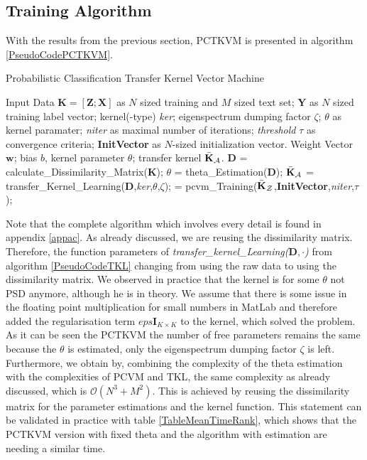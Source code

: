 \subsection{Training Algorithm}\label{InSubSecTraining}
With the results from the previous section, \acs{PCTKVM} is presented in algorithm \ref{PseudoCodePCTKVM}.
\begin{algorithm}
	\caption{Probabilistic Classification Transfer Kernel Vector Machine }\label{PseudoCodePCTKVM}	
	\begin{algorithmic}[1]
		\Require Input Data $\mathbf{K} = [\mathbf{Z};\mathbf{X}]$ as $N$ sized training and $M$ sized text set; $\mathbf{Y}$ as $N$ sized training label vector; kernel(-type) \textit{ker}; eigenspectrum dumping factor $\zeta$; $\theta$ as kernel paramater; \textit{niter} as maximal number of iterations; \textit{threshold} $\tau$ as convergence criteria; \textbf{InitVector} as $N$-sized initialization vector.
		\Ensure Weight Vector $\mathbf{w}$; bias $b$, kernel parameter $\theta$; transfer kernel $\bar{\mathbf{K}}_\mathcal{A}$.
		\State $\mathbf{D}$ = calculate\_Dissimilarity\_Matrix($\mathbf{K}$);
		\State $\theta$ = theta\_Estimation($\mathbf{D}$);  
		\State $\bar{\mathbf{K}}_\mathcal{A}$ = transfer\_Kernel\_Learning($\mathbf{D}$,\textit{ker},$\theta$,$\zeta$); 
		\State [$\mathbf{w}$,$b$] = pcvm\_Training($\bar{\mathbf{K}}_\mathcal{Z}$,\textbf{InitVector},\textit{niter},$\tau$); 
	\end{algorithmic}
\end{algorithm}
Note that the complete algorithm which involves every detail is found in appendix \ref{appac}. As already discussed, we are reusing the dissimilarity matrix. Therefore, the function parameters of \textit{transfer\_kernel\_Learning($\mathbf{D},\cdot$)} from algorithm \ref{PseudoCodeTKL} changing from using the raw data to using the dissimilarity matrix.  
We observed in practice that the kernel is for some $\theta$ not \acs{PSD} anymore, although he is in theory.\cite{Long.2015}
We assume that there is some issue in the floating point multiplication for small numbers in MatLab and therefore added the regularisation term $eps\mathbf{I}_{K\times K}$ to the kernel, which solved the problem.\\
As it can be seen the \acs{PCTKVM} the number of free parameters remains the same because the $\theta$ is estimated, only the eigenspectrum dumping factor $\zeta$ is left.
Furthermore, we obtain by, combining the complexity of the theta estimation with the complexities of \acs{PCVM} and \acs{TKL}, the same complexity as already discussed, which is $\mathcal{O}(N^3+M^2)$.
This is achieved by reusing the dissimilarity matrix for the parameter estimations and the kernel function.
This statement can be validated in practice with table \ref{TableMeanTimeRank}, which shows that the \acs{PCTKVM} version with fixed theta and the algorithm with estimation are needing a similar time.
